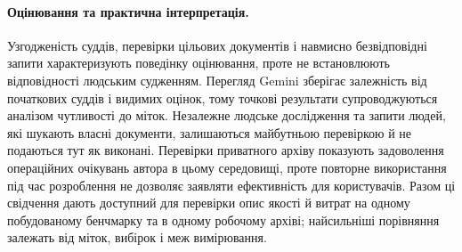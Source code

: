 \paragraph{Оцінювання та практична інтерпретація.}
Узгодженість суддів, перевірки цільових документів і навмисно безвідповідні запити характеризують поведінку оцінювання, проте не встановлюють відповідності людським судженням. Перегляд Gemini зберігає залежність від початкових суддів і видимих оцінок, тому точкові результати супроводжуються аналізом чутливості до міток. Незалежне людське дослідження та запити людей, які шукають власні документи, залишаються майбутньою перевіркою й не подаються тут як виконані. Перевірки приватного архіву показують задоволення операційних очікувань автора в цьому середовищі, проте повторне використання під час розроблення не дозволяє заявляти ефективність для користувачів. Разом ці свідчення дають доступний для перевірки опис якості й витрат на одному побудованому бенчмарку та в одному робочому архіві; найсильніші порівняння залежать від міток, вибірок і меж вимірювання.
